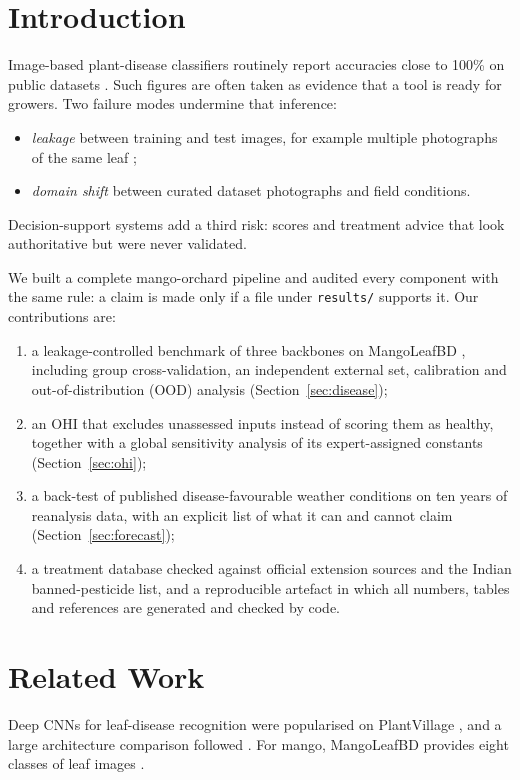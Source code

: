 \documentclass[conference]{IEEEtran}
\begin{document}
\section{Introduction}
Image-based plant-disease classifiers routinely report accuracies close to 100\% on public datasets
\cite{mohanty2016plantvillage,ferentinos2018deep}. Such figures are often taken as evidence that a tool is ready for
growers. Two failure modes undermine that inference:
\begin{itemize}
\item \emph{leakage} between training and test images, for example multiple photographs of the same leaf
\cite{kapoor2023leakage};
\item \emph{domain shift} between curated dataset photographs and field conditions.
\end{itemize}
Decision-support systems add a third risk: scores and treatment advice that look authoritative but were never
validated.

We built a complete mango-orchard pipeline and audited every component with the same rule: a claim is made only if
a file under \texttt{results/} supports it. Our contributions are:
\begin{enumerate}
\item a leakage-controlled benchmark of three backbones on MangoLeafBD \cite{ahmed2023mangoleafbd}, including group
cross-validation, an independent external set, calibration and out-of-distribution (OOD) analysis
(Section~\ref{sec:disease});
\item an OHI that excludes unassessed inputs instead of scoring them as healthy, together with a global sensitivity
analysis of its expert-assigned constants (Section~\ref{sec:ohi});
\item a back-test of published disease-favourable weather conditions on ten years of reanalysis data, with an
explicit list of what it can and cannot claim (Section~\ref{sec:forecast});
\item a treatment database checked against official extension sources and the Indian banned-pesticide list, and a
reproducible artefact in which all numbers, tables and references are generated and checked by code.
\end{enumerate}

\section{Related Work}
Deep CNNs for leaf-disease recognition were popularised on PlantVillage \cite{mohanty2016plantvillage}, and a large
architecture comparison followed \cite{ferentinos2018deep}. For mango, MangoLeafBD provides eight classes of leaf
images \cite{ahmed2023mangoleafbd}.
\end{document}

